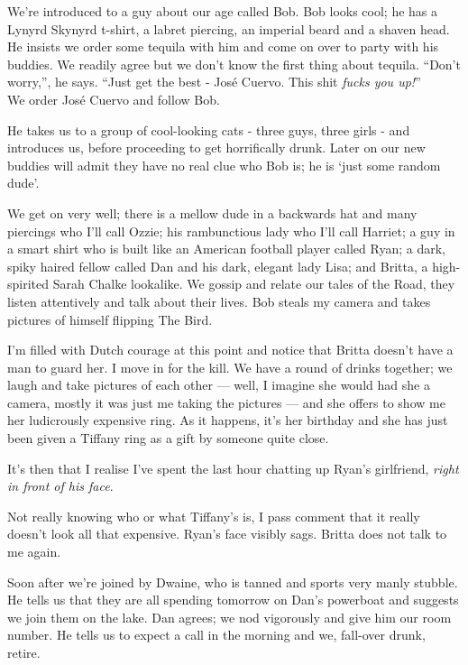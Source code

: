 \documentclass[a5paper,titlepage,11pt]{book}
\begin{document}
We're introduced to a guy about our age called Bob. Bob looks cool; he has a Lynyrd Skynyrd t-shirt, a labret piercing, an imperial beard and a shaven head. He insists we order some tequila with him and come on over to party with his buddies. We readily agree but we don't know the first thing about tequila. ``Don't worry,'', he says. ``Just get the best - Jos\'{e} Cuervo. This shit \emph{fucks you up!}'' \\
We order Jos\'{e} Cuervo and follow Bob.

He takes us to a group of cool-looking cats - three guys, three girls - and introduces us, before proceeding to get horrifically drunk. Later on our new buddies will admit they have no real clue who Bob is; he is `just some random dude'.

We get on very well; there is a mellow dude in a backwards hat and many piercings who I'll call Ozzie; his rambunctious lady who I'll call Harriet; a guy in a smart shirt who is built like an American football player called Ryan; a dark, spiky haired fellow called Dan and his dark, elegant lady Lisa; and Britta, a high-spirited Sarah Chalke lookalike. We gossip and relate our tales of the Road, they listen attentively and talk about their lives. Bob steals my camera and takes pictures of himself flipping The Bird.

I'm filled with Dutch courage at this point and notice that Britta doesn't have a man to guard her. I move in for the kill. We have a round of drinks together; we laugh and take pictures of each other --- well, I imagine she would had she a camera, mostly it was just me taking the pictures --- and she offers to show me her ludicrously expensive ring. As it happens, it's her birthday and she has just been given a Tiffany ring as a gift by someone quite close.

It's then that I realise I've spent the last hour chatting up Ryan's girlfriend, \emph{right in front of his face}.

Not really knowing who or what Tiffany's is, I pass comment that it really doesn't look all that expensive. Ryan's face visibly sags. Britta does not talk to me again.

Soon after we're joined by Dwaine, who is tanned and sports very manly stubble. He tells us that they are all spending tomorrow on Dan's powerboat and suggests we join them on the lake. Dan agrees; we nod vigorously and give him our room number. He tells us to expect a call in the morning and we, fall-over drunk, retire.
\end{document}
